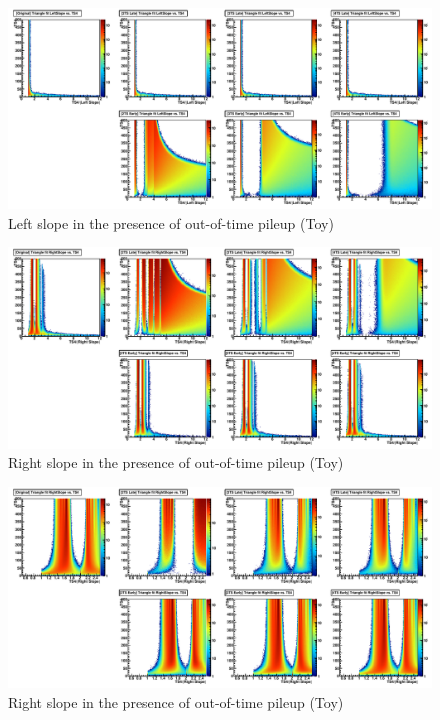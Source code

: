 \begin{figure}
   \includegraphics[width=120mm]{DailyLog/6411/6411_ToysAllChargeLeftSlope.pdf}
   \caption{Left slope in the presence of out-of-time pileup (Toy)}
   \label{Figure_6411_ToysAllChargeLeftSlope}
\end{figure}

\begin{figure}
   \includegraphics[width=120mm]{DailyLog/6411/6411_ToysAllChargeRightSlope}
   \caption{Right slope in the presence of out-of-time pileup (Toy)}
   \label{Figure_6411_ToysAllChargeRightSlope}
\end{figure}

\begin{figure}
   \includegraphics[width=120mm]{DailyLog/6411/6411_ToysAllChargeRightSlopeZoomIn.pdf}
   \caption{Right slope in the presence of out-of-time pileup (Toy)}
   \label{Figure_6411_ToysAllChargeRightSlopeZoomIn}
\end{figure}

